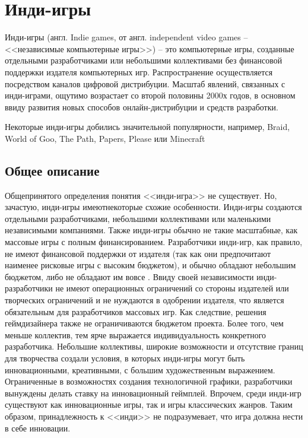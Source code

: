 \chapter{Инди-игры}
Инди-игры (англ. Indie games, от англ. independent video games -- <<независимые компьютерные игры>>) -- это
компьютерные игры, созданные отдельными разработчиками или небольшими коллективами без финансовой поддержки
издателя компьютерных игр. Распространение осуществляется посредством каналов цифровой дистрибуции. Масштаб
явлений, связанных с инди-играми, ощутимо возрастает со второй половины 2000х годов, в основном ввиду
развития новых способов онлайн-дистрибуции и средств разработки.

Некоторые инди-игры добились значительной популярности, например, Braid\cite{2.1}, World of Goo\cite{2.2}, 
The Path, Papers, Please или Minecraft\cite{2.3}

\section{Общее описание}
Общепринятого определения понятия <<инди-игра>> не существует\cite{2.5,2.7}. Но, зачастую, 
инди-игры имеютнекоторые схожие особенности. Инди-игры создаются отдельными разработчиками, небольшими 
коллективами или маленькими независимыми компаниями\cite{2.5}. Также инди-игры обычно не такие 
масштабные, как массовые игры с полным финансированием. Разработчики инди-игр, как правило, не 
имеют финансовой поддержки от издателя (так как они предпочитают наименее рисковые игры с высоким 
бюджетом\cite{2.10}), и обычно обладают небольшим бюджетом, либо не обладают им вовсе
\cite{2.5,2.7,2.12}. Ввиду своей независимости инди-разработчики не имеют операционных 
ограничений со стороны издателей или творческих ограничений\cite{2.5,2.13,2.7} и не нуждаются в
одобрении издателя, что является обязательным для разработчиков массовых игр. Как 
следствие, решения геймдизайнера также не ограничиваются бюджетом проекта\cite{2.13}. Более того, чем меньше 
коллектив, тем ярче выражается индивидуальность конкретного разработчика\cite{2.15}. Небольшие коллективы, 
широкие возможности и отсутствие границ для творчества создали условия, в которых инди-игры могут быть 
инновационными, креативными, с большим художественным выражением\cite{2.15,2.16,2.17,2.19}. 
Ограниченные в возможностях создания технологичной графики, разработчики вынуждены делать ставку на 
инновационный геймплей\cite{2.20}. Впрочем, среди инди-игр существуют как инновационные игры, так и игры 
классических жанров\cite{2.17}. Таким образом, принадлежность к <<инди>> не подразумевает, что игра должна 
нести в себе инновации\cite{2.21}.

